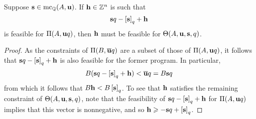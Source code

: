 \documentclass[11pt]{amsart}
\begin{document}
%
%
%
%


\begin{lemma}
\label{easy but important: L}
Suppose $\mathbf{s} \in \operatorname{mc}_{\mathbb{Q}}(A, \mathbf{u})$.   If  $\mathbf{h} \in \mathbb{Z}^n$ is such that \[ \mathbf{s}q - \left[ \mathbf{s} \right]_q + \mathbf{h}\] is feasible for $\Pi(A, \mathbf{u}q)$, then $\mathbf{h}$ must be feasible for $\Theta(A, \mathbf{u}, \mathbf{s}, q)$.
\end{lemma}

\begin{proof} As the constraints of $\Pi(B, \overline{\mathbf{u}}q)$ are a subset of those of $\Pi(A, \mathbf{u}q)$, it follows that $\mathbf{s}q - \left[ \mathbf{s} \right]_q + \mathbf{h}$ is also feasible for the former program.  In particular,  
\[ B ( \mathbf{s}q-\left[ \mathbf{s} \right]_q + \mathbf{h}) < \overline{\mathbf{u}}q = B \mathbf{s}q \] 
from which it follows that $B \mathbf{h} < B \left[ \mathbf{s} \right]_q$.  To see that $\mathbf{h}$ satisfies the remaining constraint of $\Theta(A, \mathbf{u}, \mathbf{s}, q)$, note that the feasibility of $\mathbf{s}q - \left[ \mathbf{s} \right]_q + \mathbf{h}$ for $\Pi(A, \mathbf{u}q)$ implies that this vector is nonnegative, and so $\mathbf{h} \geqslant - \mathbf{s}q + \left[ \mathbf{s} \right]_q$.  
\end{proof}
\end{document}
